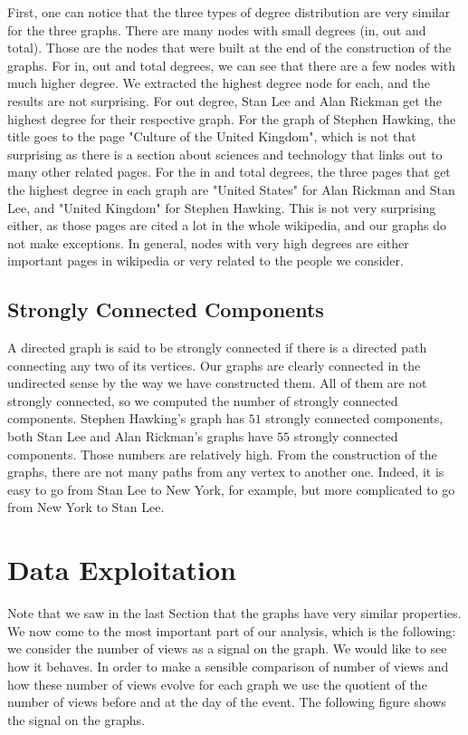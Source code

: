 \documentclass[conference]{IEEEtran}
\begin{document}
First, one can notice that the three types of degree distribution are very similar for the three graphs. There are many nodes with small degrees (in, out and total). Those are the nodes that were built at the end of the construction of the graphs. For in, out and total degrees, we can see that there are a few nodes with much higher degree. We extracted the highest degree node for each, and the results are not surprising. For out degree, Stan Lee and Alan Rickman get the highest degree for their respective graph. For the graph of Stephen Hawking, the title goes to the page "Culture of the United Kingdom", which is not that surprising as there is a section about sciences and technology that links out to many other related pages. For the in and total degrees, the three pages that get the highest degree in each graph are "United States" for Alan Rickman and Stan Lee, and "United Kingdom" for Stephen Hawking. This is not very surprising either, as those pages are cited a lot in the whole wikipedia, and our graphs do not make exceptions. In general, nodes with very high degrees are either important pages in wikipedia or very related to the people we consider. 

\subsection{Strongly Connected Components}

A directed graph is said to be strongly connected if there is a directed path connecting any two of its vertices. Our graphs are clearly connected in the undirected sense by the way we have constructed them. All of them are not strongly connected, so we computed the number of strongly connected components. Stephen Hawking's graph has $51$ strongly connected components, both Stan Lee and Alan Rickman's graphs have $55$ strongly connected components. Those numbers are relatively high. From the construction of the graphs, there are not many paths from any vertex to another one. Indeed, it is easy to go from Stan Lee to New York, for example, but more complicated to go from New York to Stan Lee. 

\section{Data Exploitation} \label{exploitation}
Note that we saw in the last Section that the graphs have very similar properties. 
We now come to the most important part of our analysis, which is the following: we consider the number of views as a signal on the graph. We would like to see how it behaves. In order to make a sensible comparison of number of views and how these number of views evolve for each graph we use the quotient of the number of views before and at the day of the event. 
The following figure shows the signal on the graphs. 
\end{document}
